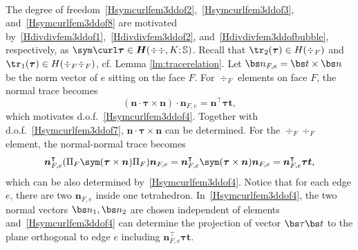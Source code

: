 {\begin{align}
\end{align}}

The degree of freedom~\eqref{Hsymcurlfem3ddof2},~\eqref{Hsymcurlfem3ddof3}, and~\eqref{Hsymcurlfem3ddof8} are motivated by~\eqref{Hdivdivfem3ddof1},~\eqref{Hdivdivfem3ddof2}, and~\eqref{Hdivdivfem3ddofbubble}, respectively, as $\sym \curl \boldsymbol \tau \in \boldsymbol H(\div\div, K;\mathbb S)$. Recall that $\tr_2(\boldsymbol \tau)\in H(\div_F)$ and $\tr_1(\boldsymbol \tau) \in H(\div_F\div_F)$, cf. Lemma \ref{lm:tracerelation}. Let $\bs n_{F,e} = \bs t\times \bs n$ be the norm vector of $e$ sitting on the face $F$. 
For $\div_F$ elements on face $F$, the normal trace becomes
\begin{equation*}%
(\boldsymbol n\cdot \boldsymbol \tau\times\boldsymbol n)\cdot \boldsymbol n_{F,e}=\boldsymbol n^{\intercal}\boldsymbol\tau\boldsymbol t,
\end{equation*}
which motivates d.o.f.~\eqref{Hsymcurlfem3ddof4}. Together with d.o.f.~\eqref{Hsymcurlfem3ddof7}, $\boldsymbol n\cdot \boldsymbol \tau\times\boldsymbol n$ can be determined. 
For the $\div_F\div_F$ element, the normal-normal trace becomes
\begin{equation}\label{eq:symcurltracepart1}
\boldsymbol n_{F,e}^{\intercal}(\Pi_F\sym(\boldsymbol\tau\times\boldsymbol n)\Pi_F)\boldsymbol n_{F,e}=\boldsymbol n_{F,e}^{\intercal}\sym(\boldsymbol\tau\times\boldsymbol n)\boldsymbol n_{F,e}= \boldsymbol n_{F,e}^{\intercal}\boldsymbol\tau\boldsymbol t,
\end{equation}
which can be also determined by~\eqref{Hsymcurlfem3ddof4}. Notice that for each edge $e$, there are two $\boldsymbol n_{F,e}$ inside one tetrahedron. In~\eqref{Hsymcurlfem3ddof4}, the two normal vectors $\bs n_1, \bs n_2$ are chosen independent of elements and~\eqref{Hsymcurlfem3ddof4} can determine the projection of vector $\bs \tau\bs t$ to the plane orthogonal to edge $e$ including $\boldsymbol n_{F,e}^{\intercal}\boldsymbol\tau\boldsymbol t$. 

